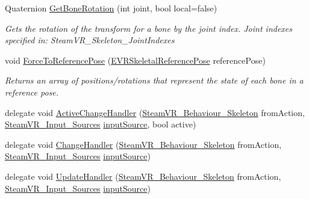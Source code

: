 \begin{DoxyCompactItemize}
Quaternion \mbox{\hyperlink{class_valve_1_1_v_r_1_1_steam_v_r___behaviour___skeleton_abb297ddb9a83001f0c95907e9dc17543}{Get\+Bone\+Rotation}} (int joint, bool local=false)
\begin{DoxyCompactList}\small\item\em Gets the rotation of the transform for a bone by the joint index. Joint indexes specified in\+: Steam\+V\+R\+\_\+\+Skeleton\+\_\+\+Joint\+Indexes \end{DoxyCompactList}\item 
void \mbox{\hyperlink{class_valve_1_1_v_r_1_1_steam_v_r___behaviour___skeleton_adc97033308aa208c491f73c49ca62231}{Force\+To\+Reference\+Pose}} (\mbox{\hyperlink{namespace_valve_1_1_v_r_a299b655881f873256f035349b59da09e}{E\+V\+R\+Skeletal\+Reference\+Pose}} reference\+Pose)
\begin{DoxyCompactList}\small\item\em Returns an array of positions/rotations that represent the state of each bone in a reference pose. \end{DoxyCompactList}\item 
delegate void \mbox{\hyperlink{class_valve_1_1_v_r_1_1_steam_v_r___behaviour___skeleton_a57f0a6388d13f0c3ac6fd1bd4aba05c9}{Active\+Change\+Handler}} (\mbox{\hyperlink{class_valve_1_1_v_r_1_1_steam_v_r___behaviour___skeleton}{Steam\+V\+R\+\_\+\+Behaviour\+\_\+\+Skeleton}} from\+Action, \mbox{\hyperlink{namespace_valve_1_1_v_r_a82e5bf501cc3aa155444ee3f0662853f}{Steam\+V\+R\+\_\+\+Input\+\_\+\+Sources}} \mbox{\hyperlink{class_valve_1_1_v_r_1_1_steam_v_r___behaviour___skeleton_a794d8178d3505640a8ec6183d8807221}{input\+Source}}, bool active)
\item 
delegate void \mbox{\hyperlink{class_valve_1_1_v_r_1_1_steam_v_r___behaviour___skeleton_ab2e28cae75fa463e2dcbeccd01607c48}{Change\+Handler}} (\mbox{\hyperlink{class_valve_1_1_v_r_1_1_steam_v_r___behaviour___skeleton}{Steam\+V\+R\+\_\+\+Behaviour\+\_\+\+Skeleton}} from\+Action, \mbox{\hyperlink{namespace_valve_1_1_v_r_a82e5bf501cc3aa155444ee3f0662853f}{Steam\+V\+R\+\_\+\+Input\+\_\+\+Sources}} \mbox{\hyperlink{class_valve_1_1_v_r_1_1_steam_v_r___behaviour___skeleton_a794d8178d3505640a8ec6183d8807221}{input\+Source}})
\item 
delegate void \mbox{\hyperlink{class_valve_1_1_v_r_1_1_steam_v_r___behaviour___skeleton_aca86be067e5094667bce3ba86677dd0b}{Update\+Handler}} (\mbox{\hyperlink{class_valve_1_1_v_r_1_1_steam_v_r___behaviour___skeleton}{Steam\+V\+R\+\_\+\+Behaviour\+\_\+\+Skeleton}} from\+Action, \mbox{\hyperlink{namespace_valve_1_1_v_r_a82e5bf501cc3aa155444ee3f0662853f}{Steam\+V\+R\+\_\+\+Input\+\_\+\+Sources}} \mbox{\hyperlink{class_valve_1_1_v_r_1_1_steam_v_r___behaviour___skeleton_a794d8178d3505640a8ec6183d8807221}{input\+Source}})

\end{DoxyCompactItemize}
